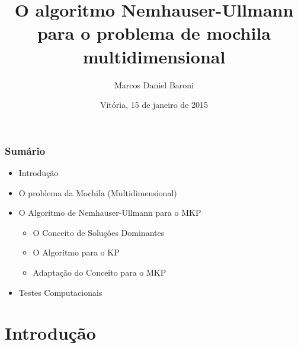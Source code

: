 \documentclass[10pt,fleqn]{beamer}
\title[]{O algoritmo Nemhauser-Ullmann para o problema de mochila multidimensional}
\subtitle{}
\author{Marcos Daniel Baroni}
\institute[NINFA]{}
\date[Vitória, 15/01/2015]{Vitória, 15 de janeiro de 2015}
\newcommand{\litem}[1]{
  \item{#1 \vspace{9pt}}
}
\begin{document}





\begin{frame}
  \titlepage
\end{frame}

\begin{frame}
  \frametitle{Sumário}
  \begin{itemize}
    \litem{Introdução}
    \litem{O problema da Mochila (Multidimensional)}
    \litem{O Algoritmo de Nemhauser-Ullmann para o MKP}
    \begin{itemize}
      \litem{O Conceito de Soluções Dominantes}
      \litem{O Algoritmo para o KP}
      \litem{Adaptação do Conceito para o MKP}
    \end{itemize}
    \litem{Testes Computacionais}
  \end{itemize}
\end{frame}

\section{Introdução}
\end{document}

